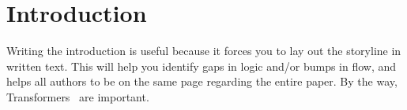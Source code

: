 \section{Introduction}\label{sec:intro}

Writing the introduction is useful because it forces you to lay out the storyline in written text.
This will help you identify gaps in logic and/or bumps in flow, and helps all authors to be on the same page regarding the entire paper.
By the way, Transformers~\cite{transformer-neurips17} are important.
